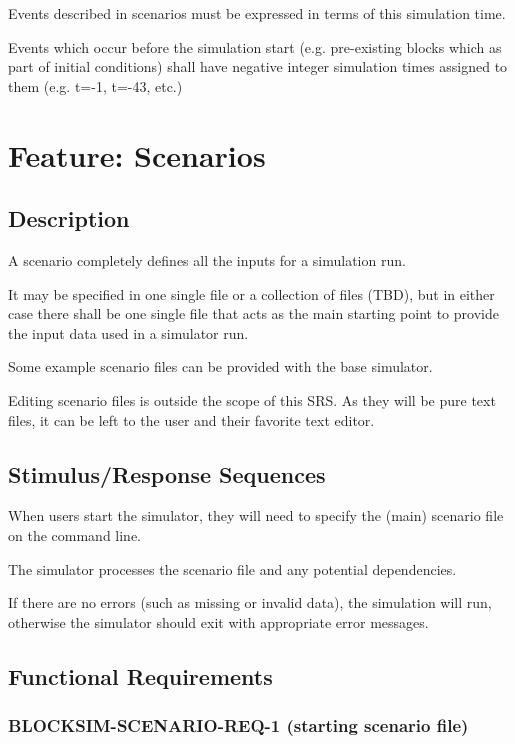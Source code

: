 \documentclass{scrreprt}
\begin{document}
        Events described in scenarios must be expressed in terms of this
        simulation time.

        Events which occur before the simulation start (e.g. pre-existing
        blocks which as part of initial conditions) shall have negative
        integer simulation times assigned to them (e.g. t=-1, t=-43, etc.)

  \section{Feature: Scenarios}

    \subsection{Description}

      A scenario completely defines all the inputs for a simulation run.

      It may be specified in one single file or a collection of files (TBD),
      but in either case there shall be one single file that acts as the
      main starting point to provide the input data used in a simulator run.

      Some example scenario files can be provided with the base simulator.

      Editing scenario files is outside the scope of this SRS.
      As they will be pure text files, it can be left to the user and
      their favorite text editor.

    \subsection{Stimulus/Response Sequences}

      When users start the simulator, they will need to specify the (main)
      scenario file on the command line.

      The simulator processes the scenario file and any potential dependencies.

      If there are no errors (such as missing or invalid data), the simulation
      will run, otherwise the simulator should exit with appropriate error
      messages.

    \subsection{Functional Requirements}

      \subsubsection{BLOCKSIM-SCENARIO-REQ-1 (starting scenario file)}
\end{document}
